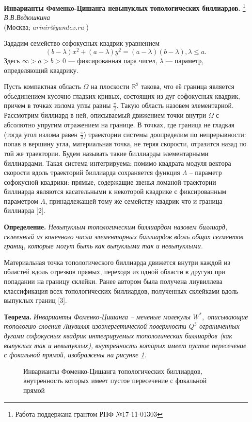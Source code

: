 \begin{center}{ \bf   Инварианты Фоменко-Цишанга невыпуклых топологических биллиардов.}%
\footnote{Работа поддержана грантом РНФ №17-11-01303}\\
 {\it В.В.Ведюшкина } \\
(Москва; {\it arinir@yandex.ru} )

\end{center}

Зададим семейство софокусных квадрик уравнением
$$(b-\lambda)x^2+(a-\lambda)y^2=(a-\lambda)(b-\lambda),   \lambda\leqslant a.    $$
Здесь $\infty> a> b>0$ --- фиксированная   пара чисел, $\lambda$ ---
параметр, определяющий квадрику.

Пусть  компактная область $\Omega$  на плоскости $\mathbb{R}^2$  такова, что её граница  является объединением кусочно-гладких кривых, состоящих из дуг софокусных квадрик, причем в точках излома  углы равны $\frac{\pi}{2}$. Такую область назовем элементарной.
Рассмотрим   биллиард  в ней, описываемый движением   точки внутри  $\Omega$ с
абсолютно упругим отражением на границе. В точках,
где граница   не гладкая
(тогда   угол излома  равен $\frac{\pi}{2}$)
 траектории системы  доопределим по непрерывности:  попав в вершину угла, материальная точка, не теряя скорости, отразится назад по той же траектории.  Будем называть такие биллиарды элементарными биллиардами.
 Такая система   интегрируема: помимо квадрата модуля вектора скорости   вдоль траекторий биллиарда сохраняется функция $\Lambda$ -- параметр софокусной квадрики: прямые, содержащие звенья ломаной-траектории биллиарда являются касательными к некоторой квадрике с фиксированным параметром $\Lambda$, принадлежащей тому же семейству квадрик что и граница биллиарда [2].

\textbf{Определение.}
{\it Невыпуклым  топологическим   биллиардом   назовем биллиард,  склеенный из конечного числа элементарных биллиардов вдоль общих   сегментов границ, которые могут быть как выпуклыми так и невыпуклыми.}

Материальная точка  топологического биллиарда движется внутри каждой из областей вдоль отрезков прямых, переходя из одной области в другую при попадании на границу склейки. Ранее автором была получена лиувиллева классификация всех  топологических биллиардов, полученных склейками вдоль выпуклых границ [3].

\textbf{Теорема.}
{\it Инварианты Фоменко-Цишанга -- меченые молекулы $W^*,$ описывающие топологию слоения Лиувилля изоэнергетической поверхности $Q^3$ ограниченных дугами софокусных квадрик интегрируемых топологических    биллиардов (как выпуклых так и невыпуклых),  внутренность которых имеет пустое пересечение с фокальной прямой,   изображены на рисунке \ref{moleculesSimple}.
 }
 \begin{figure}[h!]

\caption{Инварианты Фоменко-Цишанга топологических    биллиардов, внутренность которых имеет пустое пересечение с фокальной прямой}\label{moleculesSimple}
 \end{figure}


